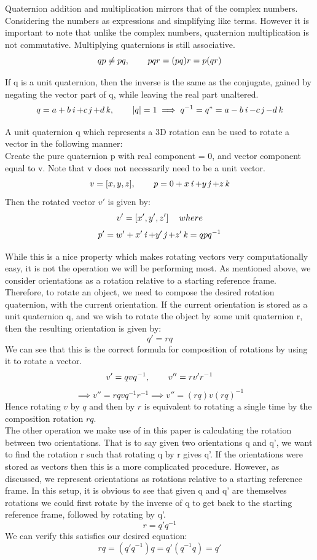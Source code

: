 Quaternion addition and multiplication mirrors that of the complex numbers. Considering the numbers as expressions and simplifying like terms. However it is important to note that unlike the complex numbers, quaternion multiplication is not commutative. Multiplying quaternions is still associative.
$$qp \neq pq, \operatorname{\operatorname{\: \: \: \:} \operatorname{\: \: \: \:}} pqr = (pq)r = p(qr)$$

If q is a unit quaternion, then the inverse is the same as the conjugate, gained by negating the vector part of q, while leaving the real part unaltered.
$$ q = a + b\operatorname{\mathit{i}} + c\operatorname{\mathit{j}} + d\operatorname{\mathit{k}}, \operatorname{\operatorname{\: \: \: \:} \operatorname{\: \: \: \:}} |q| = 1 \implies q^{-1} = q^* = a - b\operatorname{\mathit{i}} - c\operatorname{\mathit{j}} - d\operatorname{\mathit{k}}$$

A unit quaternion q which represents a 3D rotation can be used to rotate a vector in the following manner:\\
Create the pure quaternion p with real component = 0, and vector component equal to v. Note that v does not necessarily need to be a unit vector.
$$v = [x,y,z], \operatorname{\operatorname{\: \: \: \:} \operatorname{\: \: \: \:}} p = 0 + x\operatorname{\mathit{i}} + y\operatorname{\mathit{j}} + z\operatorname{\mathit{k}} $$
Then the rotated vector $v'$ is given by:
$$v' = [x', y', z'] \operatorname{\: \: \: \:} where$$
$$p' = w' + x'\operatorname{\mathit{i}} + y'\operatorname{\mathit{j}} + z'\operatorname{\mathit{k}} = qpq^{-1}$$

While this is a nice property which makes rotating vectors very computationally easy, it is not the operation we will be performing most. As mentioned above, we consider orientations as a rotation relative to a starting reference frame. Therefore, to rotate an object, we need to compose the desired rotation quaternion, with the current orientation. If the current orientation is stored as a unit quaternion q, and we wish to rotate the object by some unit quaternion r, then the resulting orientation is given by:
$$q' = rq$$
We can see that this is the correct formula for composition of rotations by using it to rotate a vector.
$$v' = qvq^{-1}, \operatorname{\operatorname{\: \: \: \:} \operatorname{\: \: \: \:}} v'' = rv'r^{-1}$$
$$\implies v'' = rqvq^{-1}r^{-1} \implies v'' = (rq)v(rq)^{-1}$$
Hence rotating $v$ by $q$ and then by $r$ is equivalent to rotating a single time by the composition rotation $rq$.\\

The other operation we make use of in this paper is calculating the rotation between two orientations. That is to say given two orientations q and q', we want to find the rotation r such that rotating q by r gives q'. If the orientations were stored as vectors then this is a more complicated procedure. However, as discussed, we represent orientations as rotations relative to a starting reference frame. In this setup, it is obvious to see that given q and q' are themselves rotations we could first rotate by the inverse of q to get back to the starting reference frame, followed by rotating by q'.
$$r = q'q^{-1}$$
We can verify this satisfies our desired equation:
$$rq = (q'q^{-1})q = q'(q^{-1}q) = q'$$


